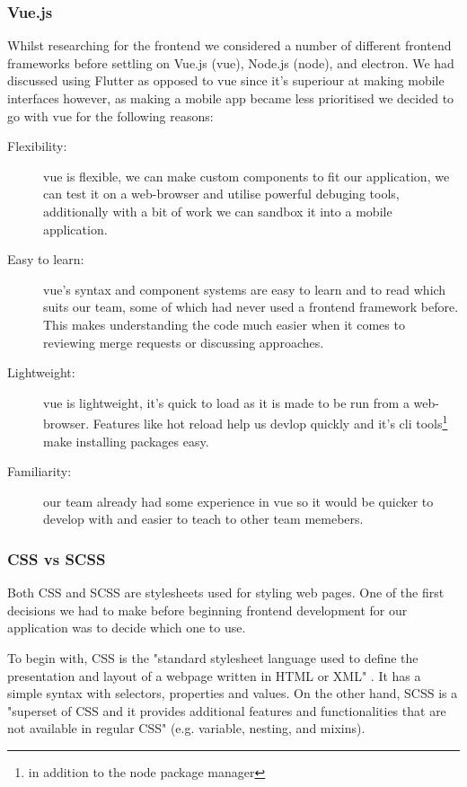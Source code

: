 \documentclass{article}
\begin{document}
\subsubsection{Vue.js}
Whilst researching for the frontend we considered a number of different
frontend frameworks before settling on Vue.js (vue), Node.js (node), and
electron. We had discussed using Flutter as opposed to vue since it's superiour
at making mobile interfaces however, as making a mobile app became less
prioritised we decided to go with vue for the following reasons:
\begin{description}
  \item[Flexibility:] vue is flexible, we can make custom components to fit our
    application, we can test it on a web-browser and utilise powerful debuging
    tools, additionally with a bit of work we can sandbox it into a mobile
    application.
  \item[Easy to learn:] vue's syntax and component systems are easy to learn and to
    read which suits our team, some of which had never used a frontend framework
    before. This makes understanding the code much easier when it comes to
    reviewing merge requests or discussing approaches.
  \item[Lightweight:] vue is lightweight, it's quick to load as it is made to be run
    from a web-browser. Features like hot reload help us devlop quickly and it's
    cli tools\footnote{in addition to the node package manager} make installing
    packages easy.
  \item[Familiarity:] our team already had some experience in vue so it would be
    quicker to develop with and easier to teach to other team memebers.
\end{description}

\subsubsection{CSS vs SCSS}
Both CSS and SCSS are stylesheets used for styling web pages. One of the first
decisions we had to make before beginning frontend development for our
application was to decide which one to use.

To begin with, CSS is the "standard stylesheet language used to define the
presentation and layout of a webpage written in HTML or XML"
\cite{geeksforgeeks}. It has a simple syntax with selectors, properties and
values. On the other hand, SCSS is a "superset of CSS and it provides
additional features and functionalities that are not available in regular CSS"
\cite{geeksforgeeks} (e.g. variable, nesting, and mixins).
\end{document}
